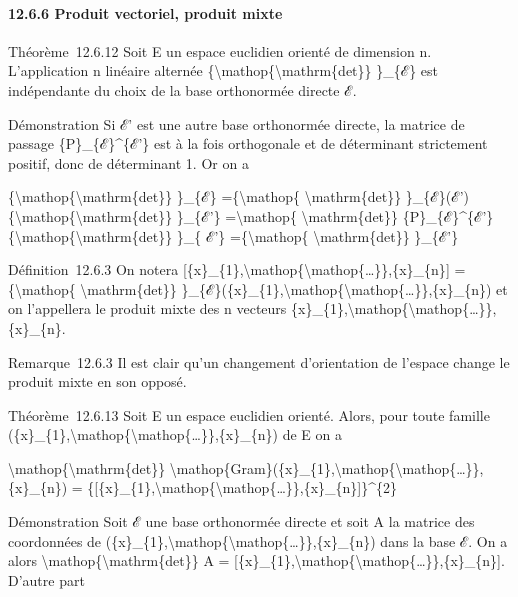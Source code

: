 \documentclass[]{article}
\begin{document}
\paragraph{12.6.6 Produit vectoriel, produit mixte}

Théorème~12.6.12 Soit E un espace euclidien orienté de dimension n.
L'application n linéaire alternée
\{\textbackslash{}mathop\{\textbackslash{}mathrm\{det\}\} \}\_\{ℰ\} est
indépendante du choix de la base orthonormée directe ℰ.

Démonstration Si ℰ' est une autre base orthonormée directe, la matrice
de passage \{P\}\_\{ℰ\}\^{}\{ℰ'\} est à la fois orthogonale et de
déterminant strictement positif, donc de déterminant 1. Or on a

\{\textbackslash{}mathop\{\textbackslash{}mathrm\{det\}\} \}\_\{ℰ\}
=\{\textbackslash{}mathop\{ \textbackslash{}mathrm\{det\}\}
\}\_\{ℰ\}(ℰ')\{\textbackslash{}mathop\{\textbackslash{}mathrm\{det\}\}
\}\_\{ℰ'\} =\textbackslash{}mathop\{ \textbackslash{}mathrm\{det\}\}
\{P\}\_\{ℰ\}\^{}\{ℰ'\}\{\textbackslash{}mathop\{\textbackslash{}mathrm\{det\}\}
\}\_\{ ℰ'\} =\{\textbackslash{}mathop\{ \textbackslash{}mathrm\{det\}\}
\}\_\{ℰ'\}

Définition~12.6.3 On notera
{[}\{x\}\_\{1\},\textbackslash{}mathop\{\textbackslash{}mathop\{\ldots{}\}\},\{x\}\_\{n\}{]}
=\{\textbackslash{}mathop\{ \textbackslash{}mathrm\{det\}\}
\}\_\{ℰ\}(\{x\}\_\{1\},\textbackslash{}mathop\{\textbackslash{}mathop\{\ldots{}\}\},\{x\}\_\{n\})
et on l'appellera le produit mixte des n vecteurs
\{x\}\_\{1\},\textbackslash{}mathop\{\textbackslash{}mathop\{\ldots{}\}\},\{x\}\_\{n\}.

Remarque~12.6.3 Il est clair qu'un changement d'orientation de l'espace
change le produit mixte en son opposé.

Théorème~12.6.13 Soit E un espace euclidien orienté. Alors, pour toute
famille
(\{x\}\_\{1\},\textbackslash{}mathop\{\textbackslash{}mathop\{\ldots{}\}\},\{x\}\_\{n\})
de E on a

\textbackslash{}mathop\{\textbackslash{}mathrm\{det\}\}
\textbackslash{}mathop\{Gram\}(\{x\}\_\{1\},\textbackslash{}mathop\{\textbackslash{}mathop\{\ldots{}\}\},\{x\}\_\{n\})
=
\{{[}\{x\}\_\{1\},\textbackslash{}mathop\{\textbackslash{}mathop\{\ldots{}\}\},\{x\}\_\{n\}{]}\}\^{}\{2\}

Démonstration Soit ℰ une base orthonormée directe et soit A la matrice
des coordonnées de
(\{x\}\_\{1\},\textbackslash{}mathop\{\textbackslash{}mathop\{\ldots{}\}\},\{x\}\_\{n\})
dans la base ℰ. On a alors
\textbackslash{}mathop\{\textbackslash{}mathrm\{det\}\} A =
{[}\{x\}\_\{1\},\textbackslash{}mathop\{\textbackslash{}mathop\{\ldots{}\}\},\{x\}\_\{n\}{]}.
D'autre part
\end{document}
